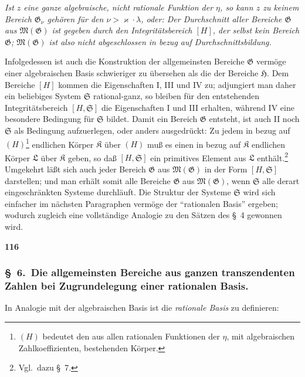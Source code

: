 \documentclass[12pt,a4paper]{article}
\begin{document}
\emph{Ist $z$ eine ganze algebraische, nicht rationale Funktion der $\eta$, so kann $z$ zu keinem Bereich $\mathfrak{G}_{\nu}$ geh\"oren f\"ur den $\nu > \varkappa \cdot \lambda$, oder: Der Durchschnitt aller Bereiche $\mathfrak{G}$ aus $\mathfrak{M}(\mathfrak{G})$ ist gegeben durch den Integrit\"atsbereich $[H]$, der selbst kein Bereich $\mathfrak{G}$; $\mathfrak{M}(\mathfrak{G})$ ist also nicht abgeschlossen in bezug auf Durchschnittsbildung.}

Infolgedessen ist auch die Konstruktion der allgemeinsten Bereiche $\mathfrak{G}$ verm\"oge einer algebraischen Basis schwieriger zu \"ubersehen als die der Bereiche $\mathfrak{H}$. Dem Bereiche $[H]$ kommen die Eigenschaften I, III und IV zu; adjungiert man daher ein beliebiges System $\mathfrak{S}$ rational-ganz, so bleiben f\"ur den entstehenden Integrit\"atsbereich $[H, \mathfrak{S}]$ die Eigenschaften I und III erhalten, w\"ahrend IV eine besondere Bedingung f\"ur $\mathfrak{S}$ bildet. Damit ein Bereich $\mathfrak{G}$ entsteht, ist auch II noch $\mathfrak{S}$ als Bedingung aufzuerlegen, oder anders ausgedr\"uckt: Zu jedem in bezug auf $(H)$\footnote{$(H)$ bedeutet den aus allen rationalen Funktionen der $\eta$, mit algebraischen Zahlkoeffizienten, bestehenden K\"orper.} endlichen K\"orper $\mathfrak{K}$ \"uber $(H)$ mu\ss{} es einen in bezug auf $\mathfrak{K}$ endlichen K\"orper $\mathfrak{L}$ \"uber $\mathfrak{K}$ geben, so da\ss{} $[H, \mathfrak{S}]$ ein primitives Element aus $\mathfrak{L}$ enth\"alt.\footnote{Vgl.\ dazu \S\ 7.} Umgekehrt l\"a\ss t sich auch jeder Bereich $\mathfrak{G}$ aus $\mathfrak{M}(\mathfrak{G})$ in der Form $[H, \mathfrak{S}]$ darstellen; und man erh\"alt somit alle Bereiche $\mathfrak{G}$ aus $\mathfrak{M}(\mathfrak{G})$, wenn $\mathfrak{S}$ alle derart eingeschr\"ankten Systeme durchl\"auft. Die Struktur der Systeme $\mathfrak{S}$ wird sich einfacher im n\"achsten Paragraphen verm\"oge der ``rationalen Basis'' ergeben; wodurch zugleich eine vollst\"andige Analogie zu den S\"atzen des \S\ 4 gewonnen wird.

\newpage
\begin{center}
\textbf{116}
\end{center}

\subsubsection*{\S\ 6.\ Die allgemeinsten Bereiche aus ganzen transzendenten Zahlen bei Zugrundelegung einer rationalen Basis.}

In Analogie mit der algebraischen Basis ist die \emph{rationale Basis} zu definieren:
\end{document}
